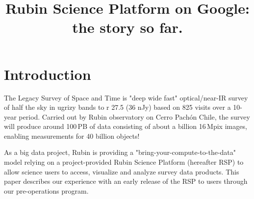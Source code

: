 \documentclass[11pt,twoside]{article}
\begin{document}
\title{Rubin Science Platform on Google: the story so far.}








\section{Introduction}

The Legacy Survey of Space and Time \citep{2019ApJ...873..111I} is "deep wide fast" optical/near-IR survey of half the sky in ugrizy bands to r 27.5 (36 nJy) based on 825 visits over a 10-year period.
Carried out by Rubin observatory on Cerro Pach\'{o}n Chile, the survey will produce around 100\,PB of data consisting of about a billion 16\,Mpix images, enabling measurements for 40 billion objects!

As a big data project, Rubin is providing a "bring-your-compute-to-the-data" model relying on a project-provided Rubin Science Platform (hereafter RSP) to allow science users to access, visualize and analyze survey data products.
This paper describes our experience with an early release of the RSP to users through our pre-operations program.
\end{document}
